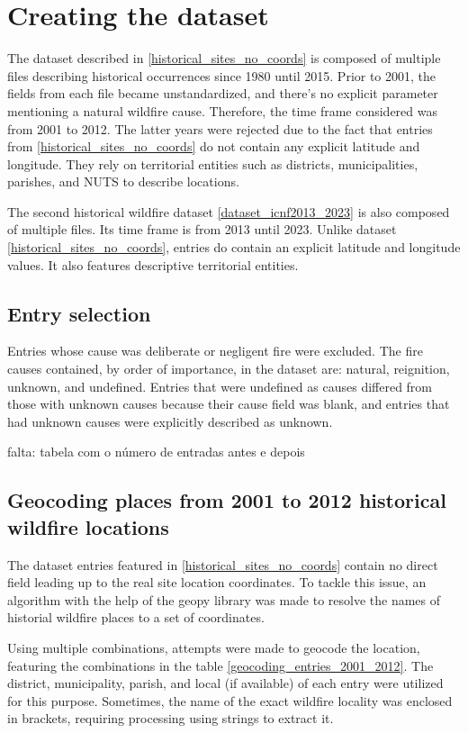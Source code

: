 \section{Creating the dataset}
The dataset described in \ref{historical_sites_no_coords} is composed of multiple files describing historical occurrences since 1980 until 2015. Prior to 2001, the fields from each file became unstandardized, and there's no explicit parameter mentioning a natural wildfire cause. Therefore, the time frame considered was from 2001 to 2012. The latter years were rejected due to the fact that entries from \ref{historical_sites_no_coords} do not contain any explicit latitude and longitude. They rely on territorial entities such as districts, municipalities, parishes, and NUTS to describe locations.

The second historical wildfire dataset \ref{dataset_icnf2013_2023} is also composed of multiple files. Its time frame is from 2013 until 2023. Unlike dataset \ref{historical_sites_no_coords}, entries do contain an explicit latitude and longitude values. It also features descriptive territorial entities. 


\subsection{Entry selection}
Entries whose cause was deliberate or negligent fire were excluded. The fire causes contained, by order of importance, in the dataset are: natural, reignition, unknown, and undefined.
Entries that were undefined as causes differed from those with unknown causes because their cause field was blank, and entries that had unknown causes were explicitly described as unknown.

falta: tabela com o número de entradas antes e depois



\subsection{Geocoding places from 2001 to 2012 historical wildfire locations}
\label{geocoding_historical}
The dataset entries featured in \ref{historical_sites_no_coords} contain no direct field leading up to the real site location coordinates. To tackle this issue, an algorithm with the help of the geopy library \cite{geopy} was made to resolve the names of historial wildfire places to a set of coordinates.


Using multiple combinations, attempts were made to geocode the location, featuring the combinations in the table \ref{geocoding_entries_2001_2012}. The district, municipality, parish, and local (if available) of each entry were utilized for this purpose. Sometimes, the name of the exact wildfire locality was enclosed in brackets, requiring processing using strings to extract it.



